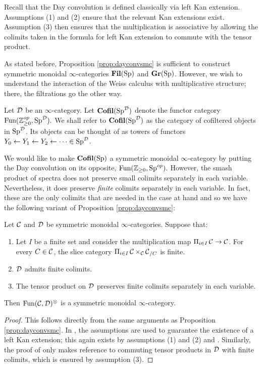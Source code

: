 Recall that the Day convolution is defined classically via left Kan extension.  Assumptions (1) and (2) ensure that the relevant Kan extensions exist.  Assumption (3) then ensures that the multiplication is associative by allowing the colimits taken in the formula for left Kan extension to commute with the tensor product.  

As stated before, Proposition \ref{prop:dayconvsmc} is sufficient to construct symmetric monoidal $\infty$-categories $\operatorname{\textbf{Fil}}(\operatorname{\text{Sp}})$ and $\operatorname{\textbf{Gr}}(\operatorname{\text{Sp}})$.  However, we wish to understand the interaction of the Weiss calculus with multiplicative structure; there, the filtrations go the other way.

\begin{dfn}Let $\operatorname{\mathcal{D}}$ be an $\infty$-category.  Let $\operatorname{\textbf{Cofil}}(\operatorname{\text{Sp}}^{\operatorname{\mathcal{D}}})$ denote the functor category $\operatorname{\text{Fun}}(\operatorname{\mathbb{Z}}_{\geq 0}^{op}, \operatorname{\text{Sp}}^{\operatorname{\mathcal{D}}}).$  We shall refer to $\operatorname{\textbf{Cofil}}(\operatorname{\text{Sp}}^{\operatorname{\mathcal{D}}})$ as the category of cofiltered objects in $\operatorname{\text{Sp}}^{\operatorname{\mathcal{D}}}$.  Its objects can be thought of as towers of functors $Y_0\leftarrow Y_1\leftarrow Y_2 \leftarrow \cdots \in \operatorname{\text{Sp}}^{\operatorname{\mathcal{D}}}$.
\end{dfn}

We would like to make $\operatorname{\textbf{Cofil}}(\operatorname{\text{Sp}})$ a symmetric monoidal $\infty$-category by putting the Day convolution on its opposite, $\operatorname{\text{Fun}}(\operatorname{\mathbb{Z}}_{\geq 0}, \operatorname{\text{Sp}}^{op}).$  However, the smash product of spectra does not preserve small colimits separately in each variable.  Nevertheless, it does preserve \emph{finite} colimits separately in each variable.  In fact, these are the only colimits that are needed in the case at hand and so we have the following variant of Proposition \ref{prop:dayconvsmc}:

\begin{var}\label{var:day}
Let $\operatorname{\mathcal{C}}$ and $\operatorname{\mathcal{D}}$ be symmetric monoidal $\infty$-categories.  Suppose that:
\begin{enumerate}
\item Let $I$ be a finite set and consider the multiplication map $\Pi_{i\in I} \operatorname{\mathcal{C}} \to \operatorname{\mathcal{C}}$.  For every $C\in \operatorname{\mathcal{C}}$, the slice category $\Pi_{i\in I}\operatorname{\mathcal{C}} \times_{\operatorname{\mathcal{C}}} \operatorname{\mathcal{C}}_{/C}$ is finite.  %
\item $\operatorname{\mathcal{D}}$ admits finite colimits. 
\item The tensor product on $\operatorname{\mathcal{D}}$ preserves finite colimits separately in each variable.  
\end{enumerate}
Then $\operatorname{\text{Fun}}(\operatorname{\mathcal{C}}, \operatorname{\mathcal{D}})^{\otimes}$ is a symmetric monoidal $\infty$-category.  
\end{var}
\begin{proof}
This follows directly from the same arguments as Proposition \ref{prop:dayconvsmc}.  In \cite[Corollary 2.2.6.14]{HA}, the assumptions are used to guarantee the existence of a left Kan extension; this again exists by assumptions (1) and (2) and \cite[Lemma 4.3.2.13]{HTT}.  Similarly, the proof of \cite[Proposition 2.2.6.16]{HA} only makes reference to commuting tensor products in $\operatorname{\mathcal{D}}$ with finite colimits, which is ensured by assumption (3).  
\end{proof}


